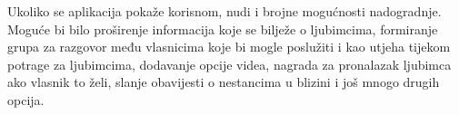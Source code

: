 Ukoliko se aplikacija pokaže korisnom, nudi i brojne mogućnosti nadogradnje. Moguće bi bilo proširenje informacija koje se bilježe o ljubimcima, formiranje grupa za razgovor među vlasnicima koje bi mogle poslužiti i kao utjeha tijekom potrage za ljubimcima, dodavanje opcije videa, nagrada za pronalazak ljubimca ako vlasnik to želi, slanje obavijesti o nestancima u blizini i još mnogo drugih opcija.

		\eject
		
		